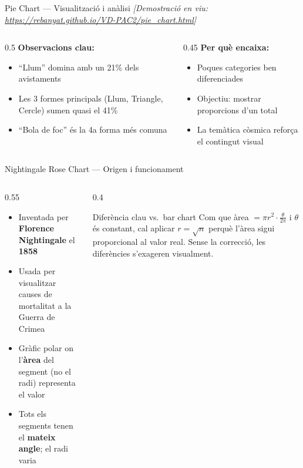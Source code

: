 \documentclass[aspectratio=169, 11pt]{beamer}
\begin{document}
\begin{frame}{Pie Chart --- Visualització i anàlisi}
\centering
\textit{[Demostració en viu: \url{https://rebanyat.github.io/VD-PAC2/pie_chart.html}]}

\vspace{1.5em}

\begin{columns}
\begin{column}{0.5\textwidth}
\textbf{Observacions clau:}
\begin{itemize}
    \item ``Llum'' domina amb un 21\% dels avistaments
    \item Les 3 formes principals (Llum, Triangle, Cercle) sumen quasi el 41\%
    \item ``Bola de foc'' és la 4a forma més comuna
\end{itemize}
\end{column}
\begin{column}{0.45\textwidth}
\textbf{Per què encaixa:}
\begin{itemize}
    \item Poques categories ben diferenciades
    \item Objectiu: mostrar proporcions d'un total
    \item La temàtica còsmica reforça el contingut visual
\end{itemize}
\end{column}
\end{columns}
\end{frame}


\begin{frame}{Nightingale Rose Chart --- Origen i funcionament}
\begin{columns}
\begin{column}{0.55\textwidth}
\begin{itemize}
    \item Inventada per \textbf{Florence Nightingale} el \textbf{1858}
    \item Usada per visualitzar causes de mortalitat a la Guerra de Crimea
    \item Gràfic polar on l'\textbf{àrea} del segment (no el radi) representa el valor
    \item Tots els segments tenen el \textbf{mateix angle}; el radi varia
\end{itemize}
\end{column}
\begin{column}{0.4\textwidth}
\begin{block}{Diferència clau vs.\ bar chart}
    \small
    Com que àrea $= \pi r^2 \cdot \frac{\theta}{2\pi}$ i $\theta$ és constant, cal aplicar $r = \sqrt{n}$ perquè l'àrea sigui proporcional al valor real.
    Sense la correcció, les diferències s'exageren visualment.
\end{block}
\end{column}
\end{columns}
\end{frame}
\end{document}
